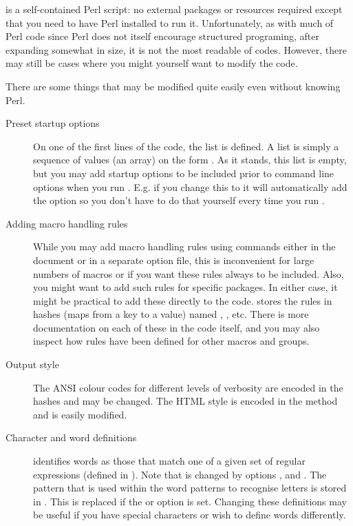\documentclass{article}
\begin{document}
\TeXcount{} is a self-contained Perl script: no external packages or resources required except that you need to have Perl installed to run it. Unfortunately, as with much of Perl code since Perl does not itself encourage structured programing, after expanding somewhat in size, it is not the most readable of codes. However, there may still be cases where you might yourself want to modify the code.

There are some things that may be modified quite easily even without knowing Perl.

\begin{description}

\item[Preset startup options]On one of the first lines of the code, the list  is defined. A list is simply a sequence of values (an array) on the form . As it stands, this list is empty, but you may add startup options to be included prior to command line options when you run \TeXcount{}. E.g. if you change this to  it will automatically add the  option so you don't have to do that yourself every time you run \TeXcount{}.

\item[Adding macro handling rules]While you may add macro handling rules using  commands either in the document or in a separate option file, this is inconvenient for large numbers of macros or if you want these rules always to be included. Also, you might want to add such rules for specific packages. In either case, it might be practical to add these directly to the \TeXcount{} code. \TeXcount{} stores the rules in hashes (maps from a key to a value) named , , etc. There is more documentation on each of these in the code itself, and you may also inspect how rules have been defined for other macros and groups.

\item[Output style]The ANSI colour codes for different levels of verbosity are encoded in the  hashes and may be changed. The HTML style is encoded in the method  and is easily modified. 

\item[Character and word definitions]\TeXcount{} identifies words as those that match one of a given set of regular expressions (defined in ). Note that  is changed by options ,  and  . The pattern that is used within the word patterns to recognise letters is stored in . This is replaced if the  or  option is set. Changing these definitions may be useful if you have special characters or wish to define words differently.

\end{description}
\end{document}
